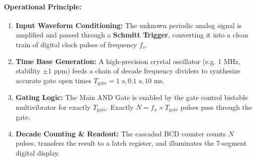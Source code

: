 \documentclass[11pt,a4paper,oneside]{book}
\begin{document}
\paragraph{Operational Principle:}
\begin{enumerate}
  \item \textbf{Input Waveform Conditioning:} The unknown periodic analog signal is amplified and passed through a \textbf{Schmitt Trigger}, converting it into a clean train of digital clock pulses of frequency $f_x$.
  \item \textbf{Time Base Generation:} A high-precision crystal oscillator (e.g. 1 MHz, stability $\pm 1\text{ ppm}$) feeds a chain of decade frequency dividers to synthesize accurate gate open times $T_{\text{gate}} = 1\text{ s}, 0.1\text{ s}, 10\text{ ms}$.
  \item \textbf{Gating Logic:} The Main AND Gate is enabled by the gate control bistable multivibrator for exactly $T_{\text{gate}}$. Exactly $N = f_x \times T_{\text{gate}}$ pulses pass through the gate.
  \item \textbf{Decade Counting \& Readout:} The cascaded BCD counter counts $N$ pulses, transfers the result to a latch register, and illuminates the 7-segment digital display.
\end{enumerate}
\end{document}
